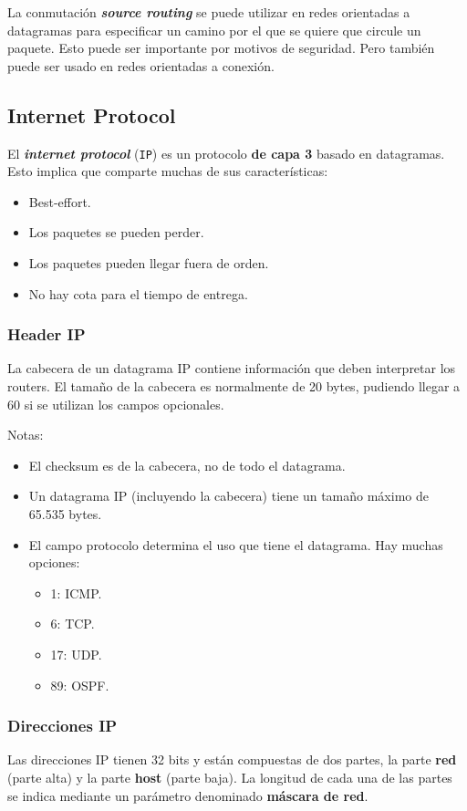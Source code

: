 \documentclass[]{article}
\begin{document}
La conmutación \textbf{\emph{source routing}} se puede utilizar en redes orientadas a datagramas para especificar un camino por el que se quiere que circule un paquete. Esto puede ser importante por motivos de seguridad. Pero también puede ser usado en redes orientadas a conexión.

\subsection{Internet Protocol}
El \textbf{\emph{internet protocol}} (\texttt{IP}) es un protocolo \textbf{de capa 3} basado en datagramas. Esto implica que comparte muchas de sus características:
\begin{itemize}
    \item Best-effort.
    \item Los paquetes se pueden perder.
    \item Los paquetes pueden llegar fuera de orden.
    \item No hay cota para el tiempo de entrega.
\end{itemize}

\subsubsection{Header IP}

La cabecera de un datagrama IP contiene información que deben interpretar los routers. El tamaño de la cabecera es normalmente de 20 bytes, pudiendo llegar a 60 si se utilizan los campos opcionales.


Notas:
\begin{itemize}
    \item El checksum es de la cabecera, no de todo el datagrama.
    \item Un datagrama IP (incluyendo la cabecera) tiene un tamaño máximo de 65.535 bytes.
    \item El campo protocolo determina el uso que tiene el datagrama. Hay muchas opciones:
    \begin{itemize}
        \item 1: ICMP.
        \item 6: TCP.
        \item 17: UDP.
        \item 89: OSPF.
    \end{itemize}
\end{itemize}

\subsubsection{Direcciones IP}
Las direcciones IP tienen 32 bits y están compuestas de dos partes, la parte \textbf{red} (parte alta) y la parte \textbf{host} (parte baja). La longitud de cada una de las partes se indica mediante un parámetro denominado \textbf{máscara de red}.
\end{document}
